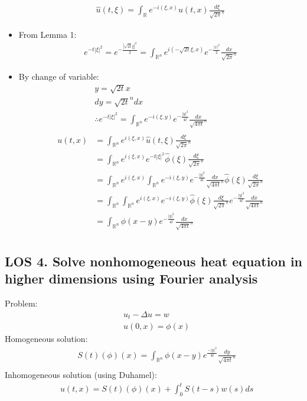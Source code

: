 \documentclass[12pt, a4paper]{article}
\begin{document}
\begin{itemize}
    \begin{align*}
        \hat{u}(t, \xi) = \int_{\mathbb{R}}e^{-i(\xi, x)}u(t, x)\frac{d\xi}{\sqrt{2\pi}^n}
    \end{align*}
    \item From Lemma 1:
    \begin{align*}
        e^{-t|\xi|^2} = e^{-\frac{|\sqrt{2t}\xi|^2}{2}} = \int_{\mathbb{R}^n}e^{i(-\sqrt{2t}\xi, x)}e^{-\frac{|x|^2}{2}}\frac{dx}{\sqrt{2\pi}^n}
    \end{align*}
    \item By change of variable:
    \begin{align*}
        &y = \sqrt{2t}x\\
        &dy = \sqrt{2t}^ndx\\
        &\therefore e^{-t|\xi|^2} = \int_{\mathbb{R}^n}e^{-i(\xi, y)}e^{-\frac{|y|^2}{4t}}\frac{dx}{\sqrt{4\pi t}^n}\\\\
        u(t, x)&=\int_{\mathbb{R}^n}e^{i(\xi, x)}\hat{u}(t, \xi)\frac{d\xi}{\sqrt{2\pi}^n}\\
        &=\int_{\mathbb{R}^n}e^{i(\xi, x)}e^{-t|\xi|^2}\hat{\phi}(\xi)\frac{d\xi}{\sqrt{2\pi}^n}\\
        &=\int_{\mathbb{R}^n}e^{i(\xi, x)} \int_{\mathbb{R}^n}e^{-i(\xi, y)}e^{-\frac{|y|^2}{4t}}\frac{dx}{\sqrt{4\pi t}^n} \hat{\phi}(\xi)\frac{d\xi}{\sqrt{2\pi}^n}\\
        &=\int_{\mathbb{R}^n}\int_{\mathbb{R}^n}e^{i(\xi, x)} e^{-i(\xi, y)} \hat{\phi}(\xi)\frac{d\xi}{\sqrt{2\pi}^n}e^{-\frac{|y|^2}{4t}}\frac{dx}{\sqrt{4\pi t}^n}\\
        &=\int_{\mathbb{R}^n}\phi(x-y)e^{-\frac{|y|^2}{4t}}\frac{dx}{\sqrt{4\pi t}^n}\\
    \end{align*}
\end{itemize}

\vspace{0.3em}

\subsection*{LOS 4. Solve nonhomogeneous heat equation in higher dimensions using Fourier analysis}
Problem:
\begin{align*}
    &u_t - \Delta u = w\\
    &u(0, x) = \phi(x)
\end{align*}
Homogeneous solution:
\begin{align*}
    &S(t)(\phi)(x) = \int_{\mathbb{R}^n}\phi(x-y)e^{\frac{-|y|^2}{4t}}\frac{dy}{\sqrt{4\pi t}^n}\\
\end{align*}
Inhomogeneous solution (using Duhamel):
\begin{align*}
    &u(t, x) = S(t)(\phi)(x) + \int_0^tS(t-s)w(s)ds
\end{align*}
\vspace{0.3em}
\end{document}
